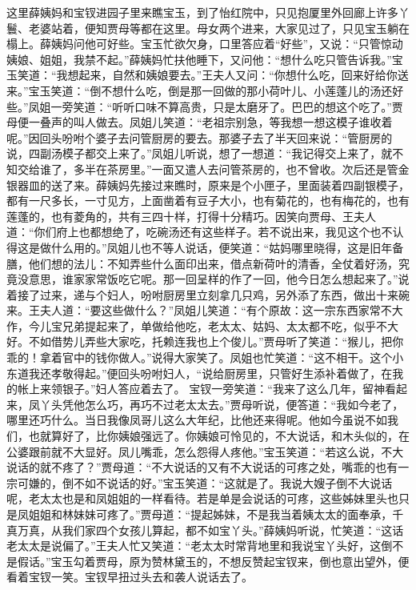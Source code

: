 \documentclass[12pt,oneside]{book}
\begin{document}
这里薛姨妈和宝钗进园子里来瞧宝玉，到了怡红院中，只见抱厦里外回廊上许多丫鬟、老婆站着，便知贾母等都在这里。母女两个进来，大家见过了，只见宝玉躺在榻上。薛姨妈问他可好些。宝玉忙欲欠身，口里答应着“好些”，又说：“只管惊动姨娘、姐姐，我禁不起。”薛姨妈忙扶他睡下，又问他：“想什么吃只管告诉我。”宝玉笑道：“我想起来，自然和姨娘要去。”王夫人又问：“你想什么吃，回来好给你送来。”宝玉笑道：“倒不想什么吃，倒是那一回做的那小荷叶儿、小莲蓬儿的汤还好些。”凤姐一旁笑道：“听听口味不算高贵，只是太磨牙了。巴巴的想这个吃了。”贾母便一叠声的叫人做去。凤姐儿笑道：“老祖宗别急，等我想一想这模子谁收着呢。”因回头吩咐个婆子去问管厨房的要去。那婆子去了半天回来说：“管厨房的说，四副汤模子都交上来了。”凤姐儿听说，想了一想道：“我记得交上来了，就不知交给谁了，多半在茶房里。”一面又遣人去问管茶房的，也不曾收。次后还是管金银器皿的送了来。薛姨妈先接过来瞧时，原来是个小匣子，里面装着四副银模子，都有一尺多长，一寸见方，上面凿着有豆子大小，也有菊花的，也有梅花的，也有莲蓬的，也有菱角的，共有三四十样，打得十分精巧。因笑向贾母、王夫人道：“你们府上也都想绝了，吃碗汤还有这些样子。若不说出来，我见这个也不认得这是做什么用的。”凤姐儿也不等人说话，便笑道：“姑妈哪里晓得，这是旧年备膳，他们想的法儿：不知弄些什么面印出来，借点新荷叶的清香，全仗着好汤，究竟没意思，谁家家常饭吃它呢。那一回呈样的作了一回，他今日怎么想起来了。”说着接了过来，递与个妇人，吩咐厨房里立刻拿几只鸡，另外添了东西，做出十来碗来。王夫人道：“要这些做什么？”凤姐儿笑道：“有个原故：这一宗东西家常不大作，今儿宝兄弟提起来了，单做给他吃，老太太、姑妈、太太都不吃，似乎不大好。不如借势儿弄些大家吃，托赖连我也上个俊儿。”贾母听了笑道：“猴儿，把你乖的！拿着官中的钱你做人。”说得大家笑了。凤姐也忙笑道：“这不相干。这个小东道我还孝敬得起。”便回头吩咐妇人，“说给厨房里，只管好生添补着做了，在我的帐上来领银子。”妇人答应着去了。
宝钗一旁笑道：“我来了这么几年，留神看起来，凤丫头凭他怎么巧，再巧不过老太太去。”贾母听说，便答道：“我如今老了，哪里还巧什么。当日我像凤哥儿这么大年纪，比他还来得呢。他如今虽说不如我们，也就算好了，比你姨娘强远了。你姨娘可怜见的，不大说话，和木头似的，在公婆跟前就不大显好。凤儿嘴乖，怎么怨得人疼他。”宝玉笑道：“若这么说，不大说话的就不疼了？”贾母道：“不大说话的又有不大说话的可疼之处，嘴乖的也有一宗可嫌的，倒不如不说话的好。”宝玉笑道：“这就是了。我说大嫂子倒不大说话呢，老太太也是和凤姐姐的一样看待。若是单是会说话的可疼，这些姊妹里头也只是凤姐姐和林妹妹可疼了。”贾母道：“提起姊妹，不是我当着姨太太的面奉承，千真万真，从我们家四个女孩儿算起，都不如宝丫头。”薛姨妈听说，忙笑道：“这话老太太是说偏了。”王夫人忙又笑道：“老太太时常背地里和我说宝丫头好，这倒不是假话。”宝玉勾着贾母，原为赞林黛玉的，不想反赞起宝钗来，倒也意出望外，便看着宝钗一笑。宝钗早扭过头去和袭人说话去了。
\end{document}
